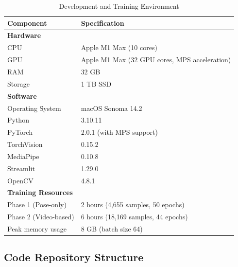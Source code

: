 \documentclass[11pt,a4paper]{article}
\begin{document}
\begin{table}[H]
\centering
\caption{Development and Training Environment}
\begin{tabular}{ll}
\toprule
Component & Specification \\
\midrule
\textbf{Hardware} & \\
\quad CPU & Apple M1 Max (10 cores) \\
\quad GPU & Apple M1 Max (32 GPU cores, MPS acceleration) \\
\quad RAM & 32 GB \\
\quad Storage & 1 TB SSD \\
\midrule
\textbf{Software} & \\
\quad Operating System & macOS Sonoma 14.2 \\
\quad Python & 3.10.11 \\
\quad PyTorch & 2.0.1 (with MPS support) \\
\quad TorchVision & 0.15.2 \\
\quad MediaPipe & 0.10.8 \\
\quad Streamlit & 1.29.0 \\
\quad OpenCV & 4.8.1 \\
\midrule
\textbf{Training Resources} & \\
\quad Phase 1 (Pose-only) & 2 hours (4,655 samples, 50 epochs) \\
\quad Phase 2 (Video-based) & 6 hours (18,169 samples, 44 epochs) \\
\quad Peak memory usage & 8 GB (batch size 64) \\
\bottomrule
\end{tabular}
\end{table}

\subsection{Code Repository Structure}
\end{document}
